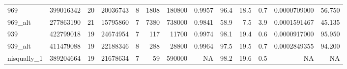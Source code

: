 \begin{table}[!t]
\begin{tabular*}{\linewidth}{@{\extracolsep{\fill}}lrrrrrrrrrrrr}
969 & 399016342 & 20 & 20036743 & 8 & 1808 & 180800 & 0.9957 & 96.4 & 18.5 & 0.7 & 0.0000709000 & 56.750 \\ 
969\_alt & 277863190 & 21 & 15795860 & 7 & 7380 & 738000 & 0.9841 & 58.9 & 7.5 & 3.9 & 0.0001591467 & 45.135 \\ 
939 & 422799018 & 19 & 24674954 & 7 & 117 & 11700 & 0.9974 & 98.1 & 19.4 & 0.6 & 0.0000917000 & 95.950 \\ 
939\_alt & 411479088 & 19 & 22188346 & 8 & 288 & 28800 & 0.9964 & 97.5 & 19.5 & 0.7 & 0.0002849355 & 94.200 \\ 
nisqually\_1 & 389204664 & 19 & 21678634 & 7 & 59 & 590000 & NA & 98.2 & 19.6 & 0.5 & NA & NA \\ 
\bottomrule
\end{tabular*}
\end{table}

